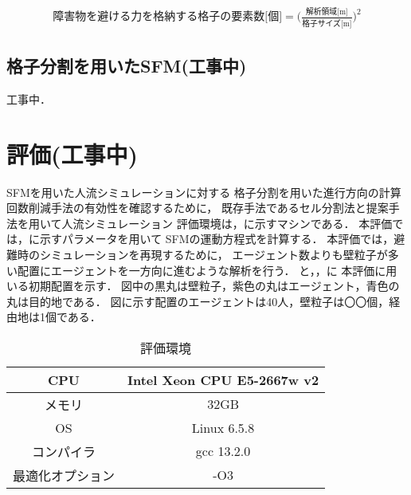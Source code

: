 

\begin{eqnarray}
 \mbox{障害物を避ける力を格納する格子の要素数[個]} =  \Big( \frac{\mbox{解析領域[m]}}{\mbox{格子サイズ[m]}} \Big) ^ 2
 \label{eq:fiw_youso_size}
\end{eqnarray}

\subsection{格子分割を用いたSFM(工事中)}
工事中．

\clearpage
\section{評価(工事中)}
SFMを用いた人流シミュレーションに対する
格子分割を用いた進行方向の計算回数削減手法の有効性を確認するために，
既存手法であるセル分割法と提案手法を用いて人流シミュレーション
評価環境は，に示すマシンである．
本評価では，に示すパラメータを用いて
SFMの運動方程式を計算する．
本評価では，避難時のシミュレーションを再現するために，
エージェント数よりも壁粒子が多い配置にエージェントを一方向に進むような解析を行う．
と，，に
本評価に用いる初期配置を示す．
図中の黒丸は壁粒子，紫色の丸はエージェント，青色の丸は目的地である．
図に示す配置のエージェントは40人，壁粒子は〇〇個，経由地は1個である．


\begin{table}[t]
  \begin{center}
    \caption{評価環境}
      \label{tb:result_env}
      \begin{tabular}{c|c}
      \hline \hline
      CPU              & Intel Xeon CPU E5-2667w v2 \\ \hline
      メモリ           & 32GB                       \\ \hline
      OS               & Linux 6.5.8               \\ \hline
      コンパイラ       & gcc 13.2.0                  \\ \hline
      最適化オプション & -O3                        \\ \hline
    \end{tabular}
  \end{center}
\end{table}

